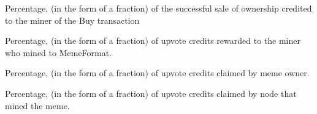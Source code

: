 \documentclass[letterpaper,10pt,english]{sphinxmanual}
\begin{document}
\begin{fulllineitems}
\label{\detokenize{index:node_state.BUY_TRANSACTION_MINER_REWARD}}
Percentage, (in the form of a fraction) of the successful sale of
ownership credited to the miner of the Buy transaction

\end{fulllineitems}


\begin{fulllineitems}
\label{\detokenize{index:node_state.MEME_FORMAT_MINER_REWARD}}
Percentage, (in the form of a fraction) of upvote credits rewarded
to the miner who mined to MemeFormat.

\end{fulllineitems}


\begin{fulllineitems}
\label{\detokenize{index:node_state.MEME_FORMAT_OWNER_PORTION}}
Percentage, (in the form of a fraction) of upvote credits claimed
by meme owner.

\end{fulllineitems}


\begin{fulllineitems}
\label{\detokenize{index:node_state.MEME_MINER_PORTION}}
Percentage, (in the form of a fraction) of
upvote credits claimed by node that mined
the meme.

\end{fulllineitems}
\end{document}
